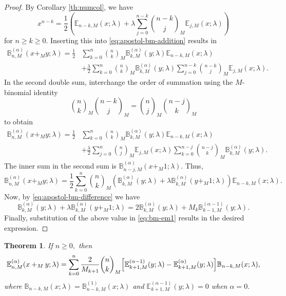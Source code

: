 \documentclass[12pt, a4paper]{article}
\newtheorem{theorem}{Theorem}[section]
\theoremstyle{definition}
\numberwithin{equation}{section}
\newcommand{\B}{\mathbb{B}}
\newcommand{\E}{\mathbb{E}}
\begin{document}
\begin{proof}
By Corollary \ref{th:numcol}, we have 
\[
x^{n-k}= \frac{1}{2}\left(\E_{n-k,M}(x;\lambda)+\lambda\sum_{j=0}^{n-k}\binom{n-k}{j}_M\E_{j,M}(x;\lambda)\right)
\]
for $n \geq k \geq 0$. Inserting this into \eqref{eq:apostol-bm-addition} results in
\begin{align*}
\B_{n,M}^{(\alpha)}(x+_M y;\lambda)=
\frac{1}{2}&\sum_{k=0}^n\binom{n}{k}_M\B_{k,M}^{(\alpha)}(y;\lambda)\E_{n-k,M}(x;\lambda)\\
&+\frac{\lambda}{2}\sum_{k=0}^n\binom{n}{k}_M\B_{k,M}^{(\alpha)}(y;\lambda)
\sum_{j=0}^{n-k}\binom{n-k}{j}_M\E_{j,M}(x;\lambda).
\end{align*}
In the second double sum, interchange the order of summation using the $M$-binomial identity
\[
\binom{n}{k}_M\binom{n-k}{j}_M = \binom{n}{j}_M\binom{n-j}{k}_M
\]
to obtain
\begin{align*}
\B_{n,M}^{(\alpha)}(x+_M y;\lambda)=
\frac{1}{2}&\sum_{k=0}^n\binom{n}{k}_M\B_{k,M}^{(\alpha)}(y;\lambda)\E_{n-k,M}(x;\lambda)\\
&+\frac{\lambda}{2}\sum_{j=0}^n\binom{n}{j}_M\E_{j,M}(x;\lambda)
\sum_{k=0}^{n-j}\binom{n-j}{k}_M\B_{k,M}^{(\alpha)}(y;\lambda).
\end{align*}
The inner sum in the second sum is $\B_{n-j,M}^{(\alpha)}(x+_M1;\lambda)$. Thus,
\begin{equation}\label{eq:bm-em1}
\B_{n,M}^{(\alpha)}(x+_M y;\lambda)=
\frac{1}{2}\sum_{k=0}^n\binom{n}{k}_M\left(\B_{k,M}^{(\alpha)}(y;\lambda)+\lambda\B_{k,M}^{(\alpha)}(y+_M1;\lambda)\right)\E_{n-k,M}(x;\lambda).
\end{equation}
Now, by \eqref{eq:apostol-bm-difference} we have
\[
\B_{k,M}^{(\alpha)}(y;\lambda)+\lambda\B_{k,M}^{(\alpha)}(y+_M1;\lambda) = 2\B_{k,M}^{(\alpha)}(y;\lambda)+M_k\B_{k-1,M}^{(\alpha-1)}(y;\lambda).
\]
Finally, substitution of the above value in \eqref{eq:bm-em1} results in the desired expression.
\end{proof}

\begin{theorem}\label{thm:mixed-euler}
If $n \geq 0,$ then
\[
\E_{n,M}^{(\alpha)}(x+_M y;\lambda)
= \sum_{k=0}^n \frac{2}{M_{k+1}}\binom{n}{k}_M
\Bigl[\E_{k+1,M}^{(\alpha-1)}(y;\lambda) - \E_{k+1,M}^{(\alpha)}(y;\lambda)\Bigr]
\B_{n-k,M}(x;\lambda),
\]
where $\B_{n-k,M}(x;\lambda)=\B_{n-k,M}^{(1)}(x;\lambda)$ and $\E_{k+1,M}^{(\alpha-1)}(y;\lambda)=0$ when $\alpha=0.$
\end{theorem}
\end{document}
